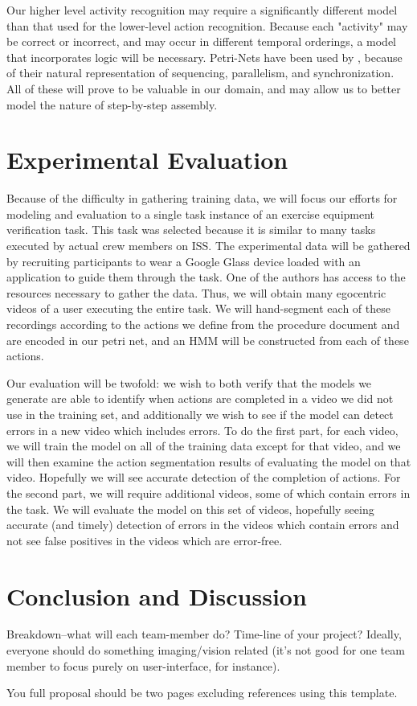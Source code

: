 \documentclass[10pt,letterpaper]{article}
\begin{document}
Our higher level activity recognition may require a significantly different model than that used for the lower-level action recognition. Because each "activity" may be correct or incorrect, and may occur in different temporal orderings, a model that incorporates logic will be necessary. Petri-Nets have been used by \cite{castel1996going}, because of their natural representation of sequencing, parallelism, and synchronization. All of these will prove to be valuable in our domain, and may allow us to better model the nature of step-by-step assembly.

\section{Experimental Evaluation}
 
Because of the difficulty in gathering training data, we will focus our efforts for modeling and evaluation to a single task instance of an exercise equipment verification task. This task was selected because it is similar to many tasks executed by actual crew members on ISS. The experimental data will be gathered by recruiting participants to wear a Google Glass device loaded with an application to guide them through the task. One of the authors has access to the resources necessary to gather the data. Thus, we will obtain many egocentric videos of a user executing the entire task. We will hand-segment each of these recordings according to the actions we define from the procedure document and are encoded in our petri net, and an HMM will be constructed from each of these actions.

Our evaluation will be twofold: we wish to both verify that the models we generate are able to identify when actions are completed in a video we did not use in the training set, and additionally we wish to see if the model can detect errors in a new video which includes errors. To do the first part, for each video, we will train the model on all of the training data except for that video, and we will then examine the action segmentation results of evaluating the model on that video. Hopefully we will see accurate detection of the completion of actions. For the second part, we will require additional videos, some of which contain errors in the task. We will evaluate the model on this set of videos, hopefully seeing accurate (and timely) detection of errors in the videos which contain errors and not see false positives in the videos which are error-free.
 
\section{Conclusion and Discussion}
 
Breakdown--what will each team-member do? Time-line of your project? Ideally, everyone should do something imaging/vision related (it's not good for one team member to focus purely on user-interface, for instance).

You full proposal should be two pages excluding references using this template.

\clearpage

{\small


}
\end{document}
